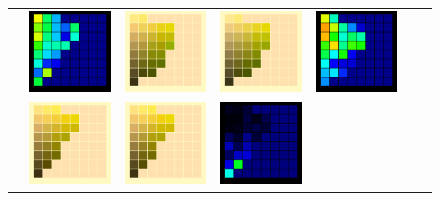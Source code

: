 \begin{figure}[t!]
{\begin{tabular}{ccccccc}
			& 
			\includegraphics[width=.155\linewidth]{img/results_uplift_page13_diff_sigmoidFL11.png}
			&\quad
			\includegraphics[width=.155\linewidth]{img/results_uplift_page14_originalFL11.png}
			&
			\includegraphics[width=.155\linewidth]{img/results_uplift_page14_sigmoidFL11.png}
			&
			\includegraphics[width=.155\linewidth]{img/results_uplift_page14_diff_sigmoidFL11.png}
			\\ \raisebox{0.5cm}[0pt][0pt]{\parbox[c][0pt][c]{0cm}{\hspace{-1.5em}\\[20pt]}\par}
			&
			\includegraphics[width=.155\linewidth]{img/results_uplift_page13_originalFL11.png}
			&
			\includegraphics[width=.155\linewidth]{img/results_uplift_page13_ourFL11.png}
			& 
			\includegraphics[width=.155\linewidth]{img/results_uplift_page13_diff_ourFL11.png}

\end{tabular}}
\end{figure}
